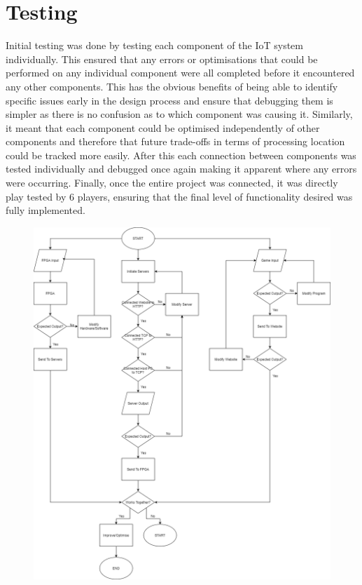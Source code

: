 \documentclass[12pt,a4paper]{article}
\begin{document}
\section{\normalsize Testing}

{\scriptsize Initial testing was done by testing each component of the IoT system individually. 
This ensured that any errors or optimisations that could be performed on any 
individual component were all completed before it encountered any other components. 
This has the obvious benefits of being able to identify specific issues early in 
the design process and ensure that debugging them is simpler as there is no confusion 
as to which component was causing it. Similarly, it meant that each component could 
be optimised independently of other components and therefore that future trade-offs 
in terms of processing location could be tracked more easily. After this each 
connection between components was tested individually and debugged once again making 
it apparent where any errors were occurring. Finally, once the entire project was 
connected, it was directly play tested by 6 players, ensuring that the final level 
of functionality desired was fully implemented. }
\begin{figure} [h!]
    \centering
    \includegraphics[scale = 0.25]{Flowchart.png}
\end{figure}
\end{document}

